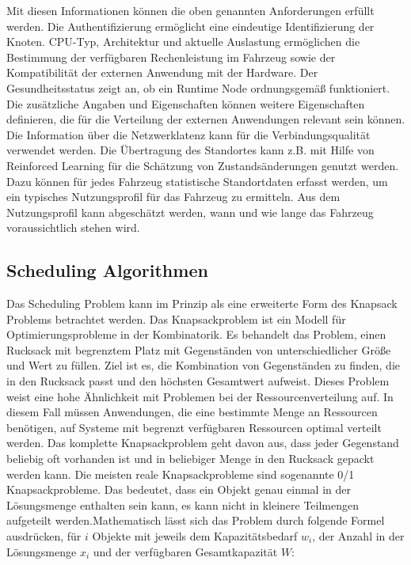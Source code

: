 Mit diesen Informationen können die oben genannten Anforderungen erfüllt werden. Die Authentifizierung ermöglicht eine eindeutige Identifizierung der Knoten. CPU-Typ, Architektur und aktuelle Auslastung ermöglichen die Bestimmung der verfügbaren Rechenleistung im Fahrzeug sowie der Kompatibilität der externen Anwendung mit der Hardware. Der Gesundheitsstatus zeigt an, ob ein Runtime Node ordnungsgemäß funktioniert. Die zusätzliche Angaben und Eigenschaften können weitere Eigenschaften definieren, die für die Verteilung der externen Anwendungen relevant sein können. Die Information über die Netzwerklatenz kann für die Verbindungsqualität verwendet werden. Die Übertragung des Standortes kann z.B. mit Hilfe von Reinforced Learning für die Schätzung von Zustandsänderungen genutzt werden. Dazu können für jedes Fahrzeug statistische Standortdaten erfasst werden, um ein typisches Nutzungsprofil für das Fahrzeug zu ermitteln. Aus dem Nutzungsprofil kann abgeschätzt werden, wann und wie lange das Fahrzeug voraussichtlich stehen wird. 

\subsection{Scheduling Algorithmen}
\label{Scheduling Algorithmen}

Das Scheduling Problem kann im Prinzip als eine erweiterte Form des Knapsack Problems betrachtet werden. Das Knapsackproblem ist ein Modell für Optimierungsprobleme in der Kombinatorik. Es behandelt das Problem, einen Rucksack mit begrenztem Platz mit Gegenständen von unterschiedlicher Größe und Wert zu füllen. Ziel ist es, die Kombination von Gegenständen zu finden, die in den Rucksack passt und den höchsten Gesamtwert aufweist. Dieses Problem weist eine hohe Ähnlichkeit mit Problemen bei der Ressourcenverteilung auf. In diesem Fall müssen Anwendungen, die eine bestimmte Menge an Ressourcen benötigen, auf Systeme mit begrenzt verfügbaren Ressourcen optimal verteilt werden. Das komplette Knapsackproblem geht davon aus, dass jeder Gegenstand beliebig oft vorhanden ist und in beliebiger Menge in den Rucksack gepackt werden kann. Die meisten reale Knapsackprobleme sind sogenannte 0/1 Knapsackprobleme. Das bedeutet, dass ein Objekt genau einmal in der Lösungsmenge enthalten sein kann, es kann nicht in kleinere Teilmengen aufgeteilt werden.Mathematisch lässt sich das Problem durch folgende Formel ausdrücken, für $ i $ Objekte mit jeweils dem Kapazitätsbedarf $ w_i $, der Anzahl in der Lösungsmenge $ x_i $ und der verfügbaren Gesamtkapazität $ W $:

